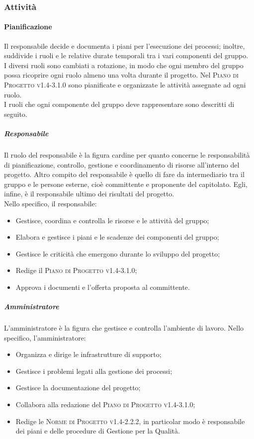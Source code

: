 \documentclass[../norme-di-progetto.tex]{subfiles}
\begin{document}
\subsubsection{Attività}
\paragraph{Pianificazione}
Il responsabile decide e documenta i piani per l'esecuzione dei processi; inoltre, suddivide i ruoli e le relative durate temporali tra i vari componenti del gruppo. \\
I diversi ruoli sono cambiati a rotazione, in modo che ogni membro del gruppo possa ricoprire ogni ruolo almeno una volta durante il progetto. Nel \textsc{Piano di Progetto v1.4-3.1.0} sono pianificate e organizzate le attività assegnate ad ogni ruolo. \\
I ruoli che ogni componente del gruppo deve rappresentare sono descritti di seguito.
\subparagraph{Responsabile}
Il ruolo del responsabile è la figura cardine per quanto concerne le responsabilità di pianificazione, controllo, gestione e coordinamento di risorse all'interno del progetto. Altro compito del responsabile è quello di fare da intermediario tra il gruppo e le persone esterne, cioè committente e proponente del capitolato. Egli, infine, è il responsabile ultimo dei risultati del progetto. \\
Nello specifico, il responsabile:
\begin{itemize}
  \item Gestisce, coordina e controlla le risorse e le attività del gruppo;
  \item Elabora e gestisce i piani e le scadenze dei componenti del gruppo;
  \item Gestisce le criticità che emergono durante lo sviluppo del progetto;
  \item Redige il \textsc{Piano di Progetto v1.4-3.1.0};
  \item Approva i documenti e l'offerta proposta al committente.
\end{itemize}

\subparagraph{Amministratore}
L'amministratore è la figura che gestisce e controlla l'ambiente di lavoro. Nello specifico, l'amministratore:
\begin{itemize}
  \item Organizza e dirige le infrastrutture di supporto;
  \item Gestisce i problemi legati alla gestione dei processi;
  \item Gestisce la documentazione del progetto;
  \item Collabora alla redazione del \textsc{Piano di Progetto v1.4-3.1.0};
  \item Redige le \textsc{Norme di Progetto v1.4-2.2.2}, in particolar modo è responsabile dei piani e delle procedure di Gestione per la Qualità.
\end{itemize}
\end{document}
